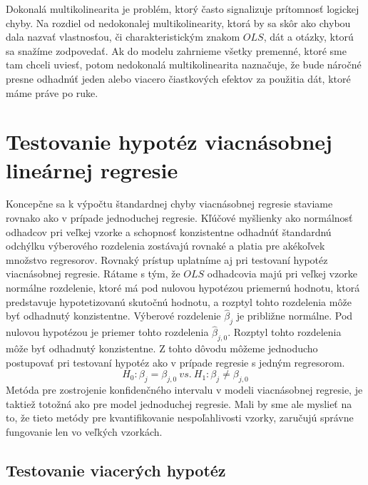 \documentclass[]{tukediphc}
\begin{document}
Dokonalá multikolinearita je problém, ktorý často signalizuje prítomnosť logickej chyby. Na rozdiel od nedokonalej multikolinearity, ktorá by sa skôr ako chybou dala nazvať vlastnosťou, či charakteristickým znakom $OLS$, dát a otázky, ktorú sa snažíme zodpovedať. Ak do modelu zahrnieme všetky premenné, ktoré sme tam chceli uviesť, potom nedokonalá multikolinearita naznačuje, že bude náročné presne odhadnúť jeden alebo viacero čiastkových efektov za použitia dát, ktoré máme práve po ruke.  

\newpage
\section{Testovanie hypotéz viacnásobnej lineárnej regresie}

Koncepčne sa k výpočtu štandardnej chyby viacnásobnej regresie staviame rovnako ako v prípade jednoduchej regresie. Kľúčové myšlienky ako normálnosť odhadcov pri veľkej vzorke a schopnosť konzistentne odhadnúť štandardnú odchýlku výberového rozdelenia zostávajú rovnaké a platia pre akékoľvek množstvo regresorov. Rovnaký prístup uplatníme aj pri testovaní hypotéz viacnásobnej regresie. Rátame s tým, že $OLS$ odhadcovia majú pri veľkej vzorke normálne rozdelenie, ktoré má pod nulovou hypotézou priemernú hodnotu, ktorá predstavuje hypotetizovanú skutočnú hodnotu, a rozptyl tohto rozdelenia môže byť odhadnutý konzistentne. Výberové rozdelenie $\hat\beta_j$ je približne normálne. Pod nulovou hypotézou je priemer tohto rozdelenia $\hat\beta_{j,0}$. Rozptyl tohto rozdelenia môže byť odhadnutý konzistentne. Z tohto dôvodu môžeme jednoducho postupovať pri testovaní hypotéz ako v prípade regresie s jedným regresorom.
\begin{equation}
    H_{0}:\beta_j = \beta_{j,0} \ vs. \ H_{1}:\beta_{j} \neq \beta_{j,0}
\end{equation}
Metóda pre zostrojenie konfidenčného intervalu v modeli viacnásobnej regresie, je taktiež totožná ako pre model jednoduchej regresie. Mali by sme ale myslieť na to, že tieto metódy pre kvantifikovanie nespoľahlivosti vzorky, zaručujú správne fungovanie len vo veľkých vzorkách. 

\subsection{Testovanie viacerých hypotéz}
\end{document}
